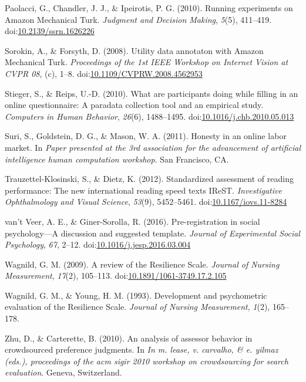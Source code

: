\documentclass[english,man]{apa6}
\theoremstyle{definition}
\theoremstyle{definition}
\theoremstyle{definition}
\theoremstyle{remark}
\begin{document}
\hypertarget{ref-Paolacci2010}{}
Paolacci, G., Chandler, J. J., \& Ipeirotis, P. G. (2010). Running
experiments on Amazon Mechanical Turk. \emph{Judgment and Decision
Making}, \emph{5}(5), 411--419.
doi:\href{https://doi.org/10.2139/ssrn.1626226}{10.2139/ssrn.1626226}

\hypertarget{ref-Sorokin2008}{}
Sorokin, A., \& Forsyth, D. (2008). Utility data annotaton with Amazon
Mechanical Turk. \emph{Proceedings of the 1st IEEE Workshop on Internet
Vision at CVPR 08}, (c), 1--8.
doi:\href{https://doi.org/10.1109/CVPRW.2008.4562953}{10.1109/CVPRW.2008.4562953}

\hypertarget{ref-Stieger2010}{}
Stieger, S., \& Reips, U.-D. (2010). What are participants doing while
filling in an online questionnaire: A paradata collection tool and an
empirical study. \emph{Computers in Human Behavior}, \emph{26}(6),
1488--1495.
doi:\href{https://doi.org/10.1016/j.chb.2010.05.013}{10.1016/j.chb.2010.05.013}

\hypertarget{ref-Suri2011}{}
Suri, S., Goldstein, D. G., \& Mason, W. A. (2011). Honesty in an online
labor market. In \emph{Paper presented at the 3rd association for the
advancement of artificial intelligence human computation workshop}. San
Francisco, CA.

\hypertarget{ref-Trauzettel-Klosinski2012}{}
Trauzettel-Klosinski, S., \& Dietz, K. (2012). Standardized assessment
of reading performance: The new international reading speed texts IReST.
\emph{Investigative Ophthalmology and Visual Science}, \emph{53}(9),
5452--5461.
doi:\href{https://doi.org/10.1167/iovs.11-8284}{10.1167/iovs.11-8284}

\hypertarget{ref-VantVeer2016}{}
van't Veer, A. E., \& Giner-Sorolla, R. (2016). Pre-registration in
social psychology---A discussion and suggested template. \emph{Journal
of Experimental Social Psychology}, \emph{67}, 2--12.
doi:\href{https://doi.org/10.1016/j.jesp.2016.03.004}{10.1016/j.jesp.2016.03.004}

\hypertarget{ref-Wagnild2009}{}
Wagnild, G. M. (2009). A review of the Resilience Scale. \emph{Journal
of Nursing Measurement}, \emph{17}(2), 105--113.
doi:\href{https://doi.org/10.1891/1061-3749.17.2.105}{10.1891/1061-3749.17.2.105}

\hypertarget{ref-Wagnild1993}{}
Wagnild, G. M., \& Young, H. M. (1993). Development and psychometric
evaluation of the Resilience Scale. \emph{Journal of Nursing
Measurement}, \emph{1}(2), 165--178.

\hypertarget{ref-Zhu2010}{}
Zhu, D., \& Carterette, B. (2010). An analysis of assessor behavior in
crowdsourced preference judgments. In \emph{In m. lease, v. carvalho, \&
e. yilmaz (eds.), proceedings of the acm sigir 2010 workshop on
crowdsourcing for search evaluation}. Geneva, Switzerland.
\end{document}
